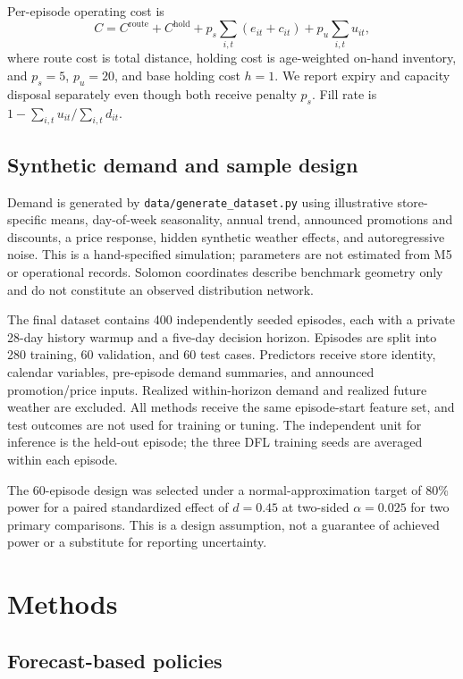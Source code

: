 \documentclass[11pt,a4paper]{article}
\begin{document}
Per-episode operating cost is
\begin{equation}
 C = C^{\mathrm{route}} + C^{\mathrm{hold}} + p_s\sum_{i,t}(e_{it}+c_{it}) + p_u\sum_{i,t}u_{it},
 \label{eq:cost}
\end{equation}
where route cost is total distance, holding cost is age-weighted on-hand inventory, and $p_s=5$, $p_u=20$, and base holding cost $h=1$. We report expiry and capacity disposal separately even though both receive penalty $p_s$. Fill rate is $1-\sum_{i,t}u_{it}/\sum_{i,t}d_{it}$.

\subsection{Synthetic demand and sample design}

Demand is generated by \texttt{data/generate\_dataset.py} using illustrative store-specific means, day-of-week seasonality, annual trend, announced promotions and discounts, a price response, hidden synthetic weather effects, and autoregressive noise. This is a hand-specified simulation; parameters are not estimated from M5 or operational records. Solomon coordinates describe benchmark geometry only and do not constitute an observed distribution network.

The final dataset contains 400 independently seeded episodes, each with a private 28-day history warmup and a five-day decision horizon. Episodes are split into 280 training, 60 validation, and 60 test cases. Predictors receive store identity, calendar variables, pre-episode demand summaries, and announced promotion/price inputs. Realized within-horizon demand and realized future weather are excluded. All methods receive the same episode-start feature set, and test outcomes are not used for training or tuning. The independent unit for inference is the held-out episode; the three DFL training seeds are averaged within each episode.

The 60-episode design was selected under a normal-approximation target of 80\% power for a paired standardized effect of $d=0.45$ at two-sided $\alpha=0.025$ for two primary comparisons. This is a design assumption, not a guarantee of achieved power or a substitute for reporting uncertainty.

\section{Methods}

\subsection{Forecast-based policies}
\end{document}
